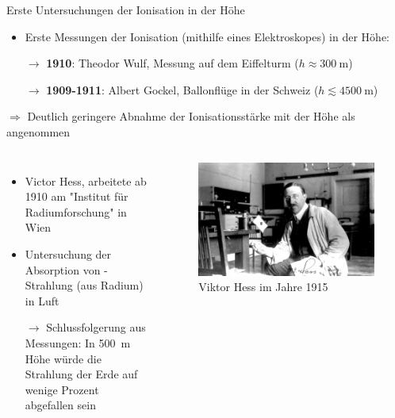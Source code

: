 \documentclass[aspectratio=1610, professionalfonts, 9pt, hyperref={colorlinks=false}]{beamer}
\begin{document}
\begin{frame}{Erste Untersuchungen der Ionisation in der Höhe}
      \begin{itemize}
        \setlength\itemsep{0.5em}
        \item Erste Messungen der Ionisation (mithilfe eines Elektroskopes) in der Höhe:
        \item[$\rightarrow$] \textbf{1910}: Theodor Wulf, Messung auf dem Eiffelturm ($h \approx \SI{300}{\metre}$)  
        \item[$\rightarrow$] \textbf{1909-1911}: Albert Gockel, Ballonflüge in der Schweiz ($h \lesssim \SI{4500}{\metre}$)
      \end{itemize}
        \vspace*{10px}

        $\Rightarrow$ Deutlich geringere Abnahme der Ionisationsstärke mit der Höhe als angenommen 
\end{frame}

\begin{frame}{}
  \begin{columns}
      \begin{itemize}
        \setlength\itemsep{0.5em}
        \item Victor Hess, arbeitete ab 1910 am "Institut für Radiumforschung" in Wien
        \item Untersuchung der Absorption von \gamma-Strahlung (aus Radium) in Luft
        \item [$\rightarrow$] Schlussfolgerung aus Messungen: In \SI{500}{\metre} Höhe würde die Strahlung der Erde auf wenige Prozent abgefallen sein
      \end{itemize}
        \vspace*{10px}
  
      \begin{figure}
          \centering
          \includegraphics[width=\linewidth]{images/X-HESS-2140.jpg}
          \caption{Viktor Hess im Jahre 1915 \cite{hess}}
      \end{figure}
  \end{columns}
\end{frame}
\end{document}
